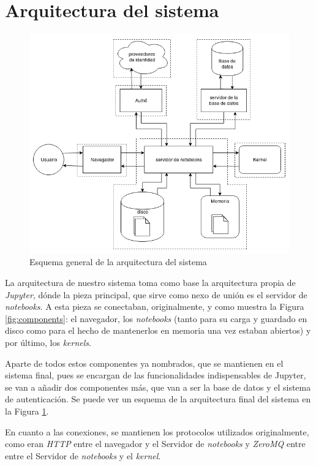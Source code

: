\documentclass[11pt,spanish,listoffigures]{tfgetsinf}
\begin{document}

\section{Arquitectura del sistema}
\label{sec:arquitectura-sistema}

\begin{figure}[h]
	\centering
  	\includegraphics[width=1\textwidth]{Architecture.png}
  	\caption{Esquema general de la arquitectura del sistema}
  	\label{fig:general-arch}
\end{figure}

La arquitectura de nuestro sistema toma como base la arquitectura propia de \textit{Jupyter}, dónde la pieza principal, que sirve como nexo de unión es el servidor de \textit{notebooks}. A esta pieza se conectaban, originalmente, y como muestra la Figura \ref{fig:components}: el navegador, los \textit{notebooks} (tanto para su carga y guardado en disco como para el hecho de mantenerlos en memoria una vez estaban abiertos) y por último, los \textit{kernels}.

Aparte de todos estos componentes ya nombrados, que se mantienen en el sistema final, pues se encargan de las funcionalidades indispensables de Jupyter, se van a añadir dos componentes más, que van a ser la base de datos y el sistema de autenticación. Se puede ver un esquema de la arquitectura final del sistema en la Figura \ref{fig:general-arch}.

En cuanto a las conexiones, se mantienen los protocolos utilizados originalmente, como eran \textit{HTTP} entre el navegador y el Servidor de \textit{notebooks} y \textit{ZeroMQ} entre entre el Servidor de \textit{notebooks} y el \textit{kernel}. 
\end{document}
